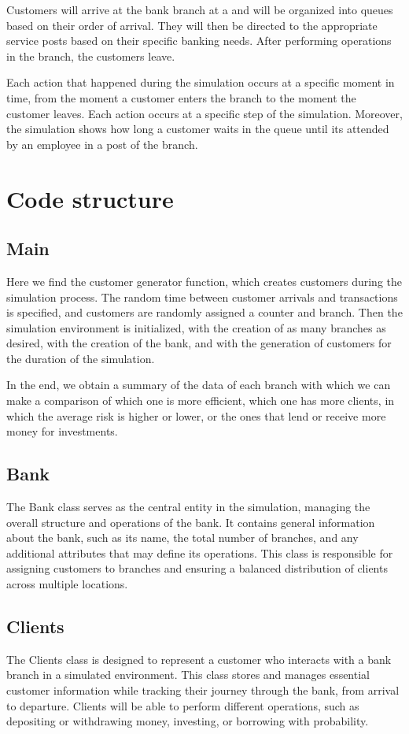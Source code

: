 \documentclass[titlepage, 12pt]{article}
\begin{document}
Customers will arrive at the bank branch at a and will be organized into queues based on their order of arrival. They will then be directed to the appropriate service posts based on their specific banking needs. After performing operations in the branch, the customers leave. 

Each action that happened during the simulation occurs at a specific moment in time, from the moment a customer enters the branch to the moment the customer leaves. Each action occurs at a specific step of the simulation. Moreover, the simulation shows how long a customer waits in the queue until its attended by an employee in a post of the branch.

\newpage

\section{Code structure}

\subsection{Main}
Here we find the customer generator function, which creates customers during the simulation process. The random time between customer arrivals and transactions is specified, and customers are randomly assigned a counter and branch. Then the simulation environment is initialized, with the creation of as many branches as desired, with the creation of the bank, and with the generation of customers for the duration of the simulation. 

In the end, we obtain a summary of the data of each branch with which we can make a comparison of which one is more efficient, which one has more clients, in which the average risk is higher or lower, or the ones that lend or receive more money for investments.

\subsection{Bank}
The Bank class serves as the central entity in the simulation, managing the overall structure and operations of the bank. It contains general information about the bank, such as its name, the total number of branches, and any additional attributes that may define its operations. This class is responsible for assigning customers to branches and ensuring a balanced distribution of clients across multiple locations.

\subsection{Clients}
The Clients class is designed to represent a customer who interacts with a bank branch in a simulated environment. This class stores and manages essential customer information while tracking their journey through the bank, from arrival to departure. Clients will be able to perform different operations, such as depositing or withdrawing money, investing, or borrowing with probability. 
\end{document}
